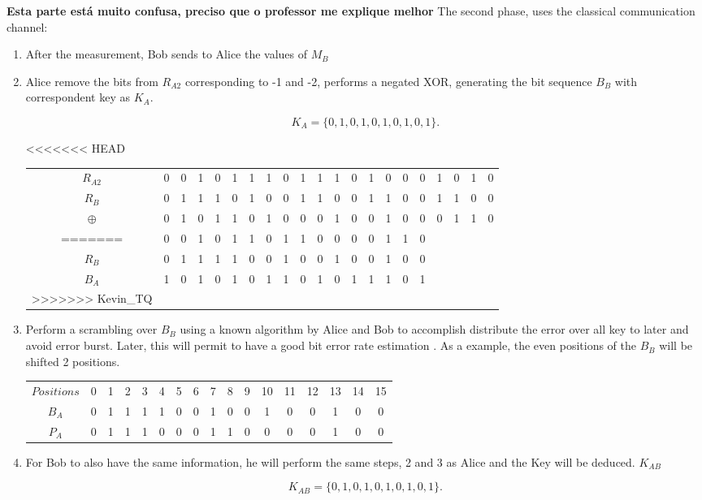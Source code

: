 \textbf{Esta parte está muito confusa, preciso que o professor me explique melhor}	
The second phase, uses the classical communication channel:
\begin{enumerate}

	\item After the measurement, Bob sends to Alice the values of $M_{B}$
	\item Alice remove the bits from $R_{A2}$ corresponding to -1 and -2, performs a negated XOR, generating the bit sequence $B_{B}$ with correspondent key as $K_{A}$.
	
  	$$ K_{A} = \{0,1,0,1,0,1,0,1,0,1\}.$$
	
	\begin{table}[H]
		\centering
<<<<<<< HEAD
		\begin{tabular}{c|c c c c c c c c c c c c c c c c c c c c}
			$R_{A2}$ & 0 & 0 & 1 & 0 & 1 & 1 & 1 & 0 & 1 & 1 & 1 & 0 & 1 & 0 & 0 & 0 & 1 & 0 & 1 & 0 \\
			$R_{B}$  & 0 & 1 & 1 & 1 & 0 & 1 & 0 & 0 & 1 & 1 & 0 & 0 & 1 & 1 & 0 & 0 & 1 & 1 & 0 & 0 \\ \hline
			$\oplus$ & 0 & 1 & 0 & 1 & 1 & 0 & 1 & 0 & 0 & 0 & 1 & 0 & 0 & 1 & 0 & 0 & 0 & 1 & 1 & 0 \\
=======
		\begin{tabular}{c|c c c c c c c c c c c c c c c c}
			$R_{A2}$ & 0 & 0 & 1 & 0 & 1 & 1 & 0 & 1 & 1 & 0 & 0 & 0 & 0 & 1 & 1 & 0 \\
			$R_{B}$  & 0 & 1 & 1 & 1 & 1 & 0 & 0 & 1 & 0 & 0 & 1 & 0 & 0 & 1 & 0 & 0 \\ \hline
			$B_{A}$ & 1 & 0 & 1 & 0 & 1 & 0 & 1 & 1 & 0 & 1 & 0 & 1 & 1 & 1 & 0 & 1 \\ 
>>>>>>> Kevin_TQ
		\end{tabular}
	\end{table}
	
	\item Perform a scrambling over $B_{B}$ using a known algorithm by Alice and Bob to accomplish distribute the error over all key to later and avoid error burst. Later, this will permit to have a good bit error rate estimation \cite{SPREADING}. As a example, the even positions of the $B_{B}$ will be shifted 2 positions.
	\begin{tabular}{c|c c c c c c c c c c c c c c c c}
		$Positions$ & 0 & 1 & 2 & 3 & 4 & 5 & 6 & 7 & 8 & 9 & 10 & 11 & 12 & 13 & 14 & 15 \\
		$B_{A}$  & 0 & 1 & 1 & 1 & 1 & 0 & 0 & 1 & 0 & 0 & 1 & 0 & 0 & 1 & 0 & 0 \\ 
		$P_{A}$  & 0 & 1 & 1 & 1 & 0 & 0 & 0 & 1 & 1 & 0 & 0 & 0 & 0 & 1 & 0 & 0 \\
	\end{tabular}
			
	
	\item For Bob to also have the same information, he will perform the same steps, 2 and 3 as Alice and the Key will be deduced.  $K_{AB}$
	
  	$$ K_{AB} = \{0,1,0,1,0,1,0,1,0,1\}.$$
		
\end{enumerate}

